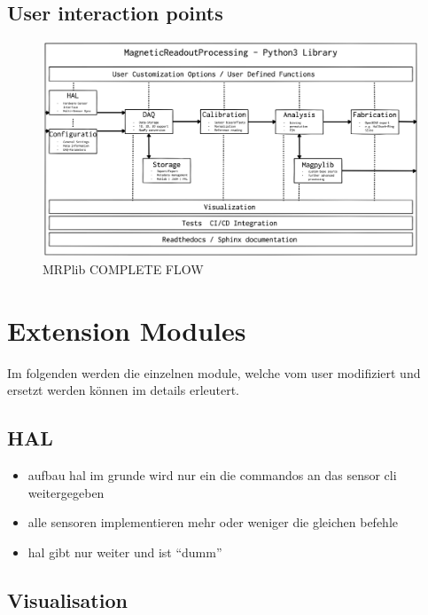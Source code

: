 \hypertarget{user-interaction-points}{%
\subsection{User interaction points}\label{user-interaction-points}}

\begin{figure}
\centering
\includegraphics{./generated_images/border_MRPlib_COMPLETE_FLOW.png}
\caption{MRPlib COMPLETE FLOW \label{MRPlib_COMPLETE_FLOW.png}}
\end{figure}

\hypertarget{extension-modules}{%
\section{Extension Modules}\label{extension-modules}}

Im folgenden werden die einzelnen module, welche vom user modifiziert
und ersetzt werden können im details erleutert.

\hypertarget{hal}{%
\subsection{HAL}\label{hal}}

\begin{itemize}
\tightlist
\item
  aufbau hal im grunde wird nur ein die commandos an das sensor cli
  weitergegeben
\item
  alle sensoren implementieren mehr oder weniger die gleichen befehle
\item
  hal gibt nur weiter und ist ``dumm''
\end{itemize}

\hypertarget{visualisation}{%
\subsection{Visualisation}\label{visualisation}}


